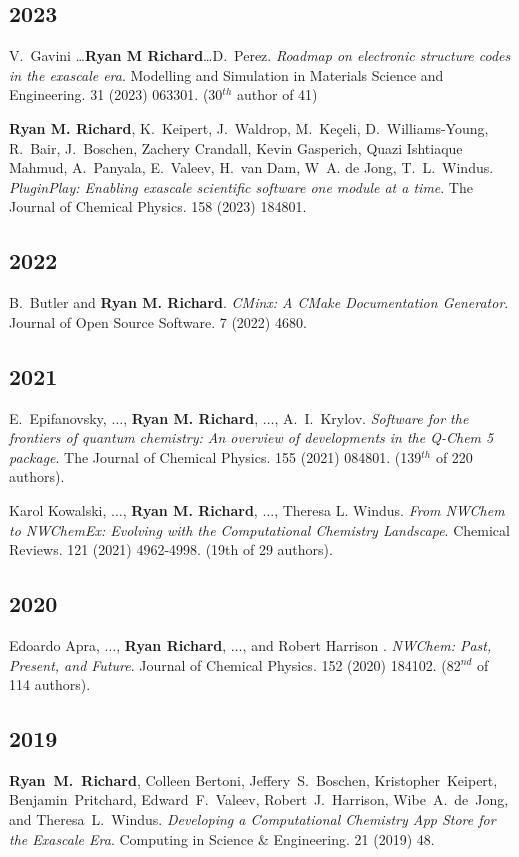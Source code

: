 \documentclass[11pt,a4paper,sans]{moderncv}
\begin{document}
\subsection{2023}
\begin{etaremune}
	\item{V.~Gavini \ldots \textbf{Ryan M Richard}\ldots D.~Perez.
	      \textit{Roadmap on electronic structure codes in the exascale era}.
		  Modelling and Simulation in Materials Science and Engineering. 31
		  (2023) 063301. (30$^{th}$ author of 41)
	}
	\item{\textbf{Ryan M. Richard}, K.~Keipert, J.~Waldrop,
	      M.~Keçeli, D.~Williams-Young, R.~Bair, J.~Boschen,
		  Zachery Crandall, Kevin Gasperich, Quazi Ishtiaque Mahmud,
		  A.~Panyala, E.~Valeev, H.~van Dam, W~A. de Jong,
		  T.~L.~Windus. \textit{PluginPlay: Enabling exascale scientific
		  software one module at a time}. The Journal of Chemical Physics. 158
		  (2023) 184801.
	}
	\subsection{2022}
	\item{B.~Butler and \textbf{Ryan M. Richard}. \textit{CMinx: A CMake
	      Documentation Generator}. Journal of Open Source Software. 7 (2022)
		  4680.
	}
	\subsection{2021}
	\item{E.~Epifanovsky, $\ldots$, \textbf{Ryan M. Richard}, $\ldots$,
	A.~I.~Krylov. \textit{Software for the frontiers of quantum chemistry: An
	overview of developments in the Q-Chem 5 package}. The Journal of Chemical
	Physics. 155 (2021) 084801. (139$^{th}$ of 220 authors).}
	\item{Karol Kowalski, $\ldots$, \textbf{Ryan M. Richard}, $\ldots$, Theresa L. Windus. \textit{From NWChem to NWChemEx: Evolving with the Computational Chemistry Landscape}. Chemical Reviews. 121 (2021) 4962-4998. (19th of 29 authors).}
	\subsection{2020}
	\item{Edoardo Apra, $\ldots$, \textbf{Ryan Richard}, $\ldots$, and Robert Harrison . \textit{NWChem: Past, Present, and Future}. Journal of Chemical Physics. 152 (2020) 184102. (82$^{nd}$ of 114 authors).}
	\subsection{2019}
	\item{\textbf{Ryan~M.~Richard}, Colleen Bertoni, Jeffery~S.~Boschen, Kristopher~Keipert, Benjamin~Pritchard, Edward~F.~Valeev, Robert~J.~Harrison, Wibe~A.~de~Jong, and Theresa~L.~Windus. \textit{Developing a Computational Chemistry App Store for the Exascale Era}. Computing in Science \& Engineering. 21 (2019) 48.}

\end{etaremune}
\end{document}
